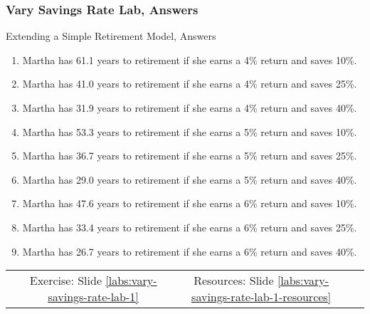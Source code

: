 \documentclass[handout, 11pt]{beamer}
\begin{document}
\begin{frame}
\frametitle{Vary Savings Rate Lab, Answers}
{
\begin{block}{Extending a Simple Retirement Model, Answers}
\begin{enumerate}
\item Martha has 61.1 years to retirement if she earns a 4\% return and saves 10\%.
\item Martha has 41.0 years to retirement if she earns a 4\% return and saves 25\%.
\item Martha has 31.9 years to retirement if she earns a 4\% return and saves 40\%.
\item Martha has 53.3 years to retirement if she earns a 5\% return and saves 10\%.
\item Martha has 36.7 years to retirement if she earns a 5\% return and saves 25\%.
\item Martha has 29.0 years to retirement if she earns a 5\% return and saves 40\%.
\item Martha has 47.6 years to retirement if she earns a 6\% return and saves 10\%.
\item Martha has 33.4 years to retirement if she earns a 6\% return and saves 25\%.
\item Martha has 26.7 years to retirement if she earns a 6\% return and saves 40\%.
\end{enumerate}
\vfill
\begin{tabular*}{\textwidth}{@{\extracolsep{\fill}}cccc}
\toprule
\hfill & Exercise: Slide \textcolor{blue}{\underline{\ref{labs:vary-savings-rate-lab-1}}} & Resources: Slide \textcolor{blue}{\underline{\ref{labs:vary-savings-rate-lab-1-resources}}} & \hfill\\

\end{tabular*}
\end{block}
}
\label{labs:vary-savings-rate-lab-1-answers}
\end{frame}
\end{document}
